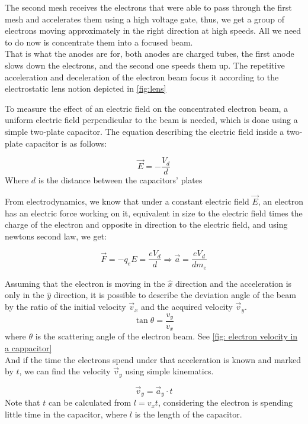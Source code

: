 \documentclass[12pt]{article}
\begin{document}
The second mesh receives the electrons that were able to pass through the first mesh and accelerates them using a high voltage gate, thus, we get a group of electrons moving approximately in the right direction at high speeds. All we need to do now is concentrate them into a focused beam. \\

That is what the anodes are for, both anodes are charged tubes, the first anode slows down the electrons, and the second one speeds them up. The repetitive acceleration and deceleration of the electron beam focus it according to the electrostatic lens notion depicted in \ref{fig:lens}


To measure the effect of an electric field on the concentrated electron beam, a uniform electric field perpendicular to the beam is needed, which is done using a simple two-plate capacitor. The equation describing the electric field inside a two-plate capacitor is as follows: 

$$\vec{E} = - \frac{V_d}{d}$$
Where $d$ is the distance between the capacitors' plates

From electrodynamics, we know that under a constant electric field $\vec{E}$, an electron has an electric force working on it, equivalent in size to the electric field times the charge of the electron and opposite in direction to the electric field, and using newtons second law, we get:

\begin{equation}
    \vec{F} = -q_e E = \frac{eV_d}{d} 
    \Rightarrow \vec a =\frac{eV_d}{d m_e}
\end{equation}

Assuming that the electron is moving in the $\hat x$ direction and the acceleration is only in the $\hat y $ direction, it is possible to describe the deviation angle of the beam by the ratio of the initial velocity $\vec v_x$ and the acquired velocity $\vec v_y$.
\begin{equation} \label{2}
    \tan{\theta}=\frac{v_y}{v_x}
\end{equation}
where $\theta$ is the scattering angle of the electron beam. See \ref{fig: electron velocity in a cappacitor}
\\

And if the time the electrons spend under that acceleration is known and marked by $t$, we can find the velocity $\vec {v} _ y$ using simple kinematics. 

$$\vec v_y = \vec a_y \cdot t$$
Note that $t$ can be calculated from $l = v_x t$, considering the electron is spending little time in the capacitor, where $l$ is the length of the capacitor.\\
\end{document}
